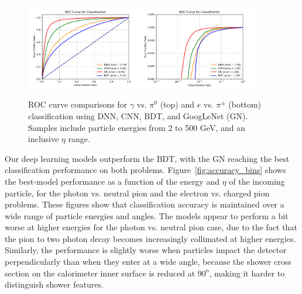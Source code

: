 \begin{figure}[htbp]
\centering
\includegraphics[width=0.45\textwidth]{Images/Calo/architectures_ROC_comparison_gamma_pi0_long.pdf}
\includegraphics[width=0.45\textwidth]{Images/Calo/architectures_ROC_comparison_ele_chpi_xlog.pdf}
\caption{ROC curve comparisons for $\gamma$ vs. $\pi^0$ (top) and $e$ vs. $\pi^\pm$ (bottom) classification using DNN, CNN, BDT, and GoogLeNet (GN). Samples include particle energies from 2 to 500 GeV, and an inclusive $\eta$ range.}
\label{fig:architectures_ROC_comparisons}
\end{figure}

Our deep learning models outperform the BDT, with the GN reaching the best classification performance on both problems. Figure~\ref{fig:accuracy_bins} shows the best-model performance as a function of the energy and $\eta$ of the incoming particle, for the photon vs. neutral pion and the electron vs. charged pion problems. These figures show that classification accuracy is maintained over a wide range of particle energies and angles. The models appear to perform a bit worse at higher energies for the photon vs. neutral pion case, due to the fact that the pion to two photon decay becomes increasingly collimated at higher energies. Similarly, the performance is slightly worse when particles impact the detector perpendicularly than when they enter at a wide angle, because the shower cross section on the calorimeter inner surface is reduced at $90^{\mathrm o}$, making it harder to distinguish shower features.

